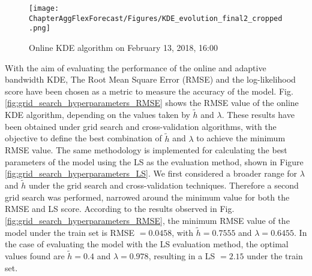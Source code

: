 \begin{figure}[!ht]
\centerline{\texttt{[image: ChapterAggFlexForecast/Figures/KDE\_evolution\_final2\_cropped.png]}}
\caption{Online KDE algorithm on February 13, 2018, 16:00}
\label{fig:KDE_EVOLUTION1}
\end{figure}

With the aim of evaluating the performance of the online and adaptive bandwidth KDE, The Root Mean Square Error (RMSE) and the log-likelihood score have been chosen as a metric to measure the accuracy of the model. Fig. \ref{fig:grid_search_hyperparameters_RMSE} shows the RMSE value of the online KDE algorithm, depending on the values taken by $\widetilde{h}$ and $\lambda$. These results have been obtained under grid search and cross-validation algorithms, with the objective to define the best combination of $\widetilde{h}$ and $\lambda$ to achieve the minimum RMSE value. The same methodology is implemented for calculating the best parameters of the model using the LS as the evaluation method, shown in Figure \ref{fig:grid_search_hyperparameters_LS}. We first considered a broader range for $\lambda$ and $\widetilde{h}$ under the grid search and cross-validation techniques. Therefore a second grid search was performed, narrowed around the minimum value for both the RMSE and LS score. According to the results observed in Fig. \ref{fig:grid_search_hyperparameters_RMSE}, the minimum RMSE value of the model under the train set is RMSE $= 0.0458$, with $\widetilde{h}=0.7555$ and $\lambda=0.6455$. In the case of evaluating the model with the LS evaluation method, the optimal values found are $\widetilde{h}=0.4$ and $\lambda=0.978$, resulting in a LS $=2.15$ under the train set.


%


